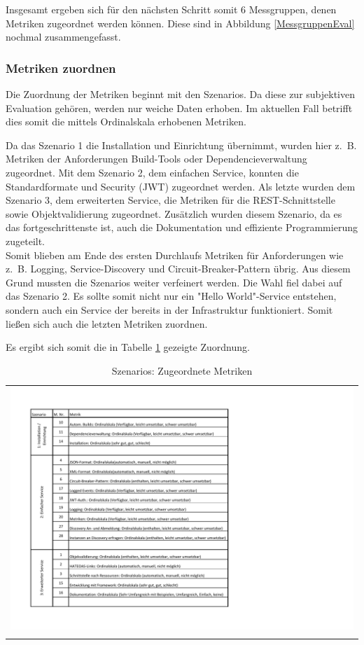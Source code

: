 Insgesamt ergeben sich für den nächsten Schritt somit 6 Messgruppen, denen Metriken zugeordnet werden können.
Diese sind in Abbildung \ref{MessgruppenEval} nochmal zusammengefasst.


\subsubsection{Metriken zuordnen}

Die Zuordnung der Metriken beginnt mit den Szenarios. Da diese zur subjektiven Evaluation gehören, werden nur weiche Daten erhoben. Im aktuellen Fall betrifft dies somit die mittels Ordinalskala erhobenen Metriken.

Da das Szenario 1 die Installation und Einrichtung übernimmt, wurden hier z.~B. Metriken der Anforderungen  Build-Tools oder Dependencieverwaltung zugeordnet. Mit dem Szenario 2, dem einfachen Service, konnten die Standardformate und Security (\ac{JWT}) zugeordnet werden. Als letzte wurden dem Szenario 3, dem erweiterten Service, die Metriken für die \ac{REST}-Schnittstelle sowie Objektvalidierung zugeordnet. Zusätzlich wurden diesem Szenario, da es das fortgeschrittenste ist, auch die Dokumentation und effiziente Programmierung zugeteilt.\\
Somit blieben am Ende des ersten Durchlaufs Metriken für Anforderungen wie z.~B. Logging, Service-Discovery und Circuit-Breaker-Pattern übrig. Aus diesem Grund mussten die Szenarios weiter verfeinert werden. Die Wahl fiel dabei auf das Szenario 2. Es sollte somit nicht nur ein "Hello World"-Service entstehen, sondern auch ein Service der bereits in der Infrastruktur funktioniert. Somit ließen sich auch die letzten Metriken zuordnen. 

Es ergibt sich somit die in Tabelle \ref{SzMetriken} gezeigte Zuordnung.  

\begin{longtable}{c}
	\includegraphics[width=\linewidth]{Bilder/SzMetriken.pdf} \\	
	\caption[Metriken Szenarios]{Szenarios: Zugeordnete Metriken}
	\label{SzMetriken}\\
\end{longtable}
\FloatBarrier

